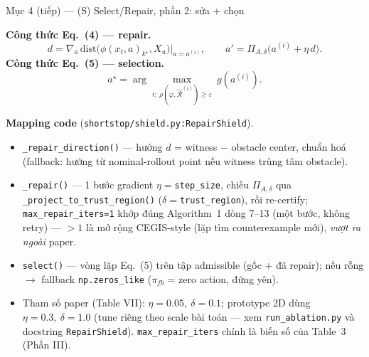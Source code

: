 \documentclass[aspectratio=169]{beamer}
\begin{document}
\begin{frame}[t,shrink=8]{Mục 4 (tiếp) --- (S) Select/Repair, phần 2: sửa + chọn}

\textbf{Công thức Eq.~(4) --- repair.}
\[
d=\nabla_a\,\mathrm{dist}\bigl(\phi(x_t,a)_{k^\star},X_u\bigr)\Big|_{a=a^{(i)}},\qquad a'=\Pi_{A,\delta}\bigl(a^{(i)}+\eta\,d\bigr).
\]
\textbf{Công thức Eq.~(5) --- selection.}
\[
a^\star=\arg\max_{i:\ \rho(\varphi,\hat{\mathcal R}^{(i)})\ge\varepsilon}\ g(a^{(i)}).
\]

\vspace{5pt}
\textbf{Mapping code} (\texttt{shortstop/shield.py:RepairShield}).
\begin{itemize}
    \item \texttt{\_repair\_direction()} --- hướng $d$ = witness $-$ obstacle center, chuẩn hoá (fallback: hướng từ nominal-rollout point nếu witness trùng tâm obstacle).
    \item \texttt{\_repair()} --- 1 bước gradient $\eta=$\texttt{step\_size}, chiếu $\Pi_{A,\delta}$ qua \texttt{\_project\_to\_trust\_region()} ($\delta=$\texttt{trust\_region}), rồi re-certify; \texttt{max\_repair\_iters=1} khớp đúng Algorithm~1 dòng 7--13 (một bước, không retry) --- $>1$ là mở rộng CEGIS-style (lặp tìm counterexample mới), \emph{vượt ra ngoài} paper.
    \item \texttt{select()} --- vòng lặp Eq.~(5) trên tập admissible (gốc + đã repair); nếu rỗng $\to$ fallback \texttt{np.zeros\_like} ($\pi_{fb}$ = zero action, đứng yên).
    \item Tham số paper (Table VII): $\eta=0.05,\ \delta=0.1$; prototype 2D dùng $\eta=0.3,\ \delta=1.0$ (tune riêng theo scale bài toán --- xem \texttt{run\_ablation.py} và docstring \texttt{RepairShield}). \texttt{max\_repair\_iters} chính là biến số của Table~3 (Phần III).
\end{itemize}
\end{frame}
\end{document}
